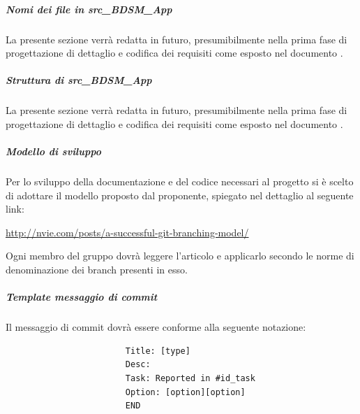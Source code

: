 				\subparagraph{Nomi dei file in src\_BDSM\_App}
				La presente sezione verrà redatta in futuro, presumibilmente nella prima fase di progettazione di dettaglio e codifica dei requisiti come esposto nel documento \docNameVersionPdP.
				\subparagraph{Struttura di src\_BDSM\_App}
				La presente sezione verrà redatta in futuro, presumibilmente nella prima fase di progettazione di dettaglio e codifica dei requisiti come esposto nel documento \docNameVersionPdP.

				\subparagraph{Modello di sviluppo}
				Per lo sviluppo della documentazione e del codice necessari al progetto si è scelto di adottare il modello proposto dal proponente, spiegato nel dettaglio al seguente link:
					\begin{center}
						\url{http://nvie.com/posts/a-successful-git-branching-model/}
					\end{center}
					Ogni membro del gruppo dovrà leggere l'articolo e applicarlo secondo le norme di denominazione dei branch presenti in esso.

				\subparagraph{Template messaggio di commit}
				\label{sec:messaggio_di_commit}
				Il messaggio di commit dovrà essere conforme alla seguente notazione:
					\begin{verbatim}
						Title: [type]
						Desc:
						Task: Reported in #id_task
						Option: [option][option]
						END
					\end{verbatim}
				
				
